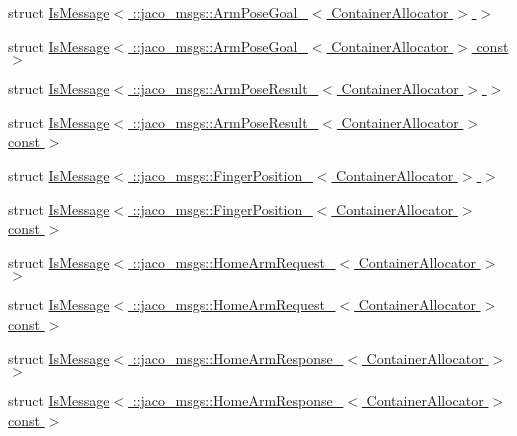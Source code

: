 \begin{DoxyCompactItemize}
\item 
struct \hyperlink{structros_1_1message__traits_1_1IsMessage_3_01_1_1jaco__msgs_1_1ArmPoseGoal___3_01ContainerAllocator_01_4_01_4}{Is\+Message$<$ \+::jaco\+\_\+msgs\+::\+Arm\+Pose\+Goal\+\_\+$<$ Container\+Allocator $>$ $>$}
\item 
struct \hyperlink{structros_1_1message__traits_1_1IsMessage_3_01_1_1jaco__msgs_1_1ArmPoseGoal___3_01ContainerAllocator_01_4_01const_01_01_4}{Is\+Message$<$ \+::jaco\+\_\+msgs\+::\+Arm\+Pose\+Goal\+\_\+$<$ Container\+Allocator $>$ const  $>$}
\item 
struct \hyperlink{structros_1_1message__traits_1_1IsMessage_3_01_1_1jaco__msgs_1_1ArmPoseResult___3_01ContainerAllocator_01_4_01_4}{Is\+Message$<$ \+::jaco\+\_\+msgs\+::\+Arm\+Pose\+Result\+\_\+$<$ Container\+Allocator $>$ $>$}
\item 
struct \hyperlink{structros_1_1message__traits_1_1IsMessage_3_01_1_1jaco__msgs_1_1ArmPoseResult___3_01ContainerAllocator_01_4_01const_01_01_4}{Is\+Message$<$ \+::jaco\+\_\+msgs\+::\+Arm\+Pose\+Result\+\_\+$<$ Container\+Allocator $>$ const  $>$}
\item 
struct \hyperlink{structros_1_1message__traits_1_1IsMessage_3_01_1_1jaco__msgs_1_1FingerPosition___3_01ContainerAllocator_01_4_01_4}{Is\+Message$<$ \+::jaco\+\_\+msgs\+::\+Finger\+Position\+\_\+$<$ Container\+Allocator $>$ $>$}
\item 
struct \hyperlink{structros_1_1message__traits_1_1IsMessage_3_01_1_1jaco__msgs_1_1FingerPosition___3_01ContainerAllocator_01_4_01const_01_01_4}{Is\+Message$<$ \+::jaco\+\_\+msgs\+::\+Finger\+Position\+\_\+$<$ Container\+Allocator $>$ const  $>$}
\item 
struct \hyperlink{structros_1_1message__traits_1_1IsMessage_3_01_1_1jaco__msgs_1_1HomeArmRequest___3_01ContainerAllocator_01_4_01_4}{Is\+Message$<$ \+::jaco\+\_\+msgs\+::\+Home\+Arm\+Request\+\_\+$<$ Container\+Allocator $>$ $>$}
\item 
struct \hyperlink{structros_1_1message__traits_1_1IsMessage_3_01_1_1jaco__msgs_1_1HomeArmRequest___3_01ContainerAllocator_01_4_01const_01_01_4}{Is\+Message$<$ \+::jaco\+\_\+msgs\+::\+Home\+Arm\+Request\+\_\+$<$ Container\+Allocator $>$ const  $>$}
\item 
struct \hyperlink{structros_1_1message__traits_1_1IsMessage_3_01_1_1jaco__msgs_1_1HomeArmResponse___3_01ContainerAllocator_01_4_01_4}{Is\+Message$<$ \+::jaco\+\_\+msgs\+::\+Home\+Arm\+Response\+\_\+$<$ Container\+Allocator $>$ $>$}
\item 
struct \hyperlink{structros_1_1message__traits_1_1IsMessage_3_01_1_1jaco__msgs_1_1HomeArmResponse___3_01ContainerAllocator_01_4_01const_01_01_4}{Is\+Message$<$ \+::jaco\+\_\+msgs\+::\+Home\+Arm\+Response\+\_\+$<$ Container\+Allocator $>$ const  $>$}

\end{DoxyCompactItemize}
